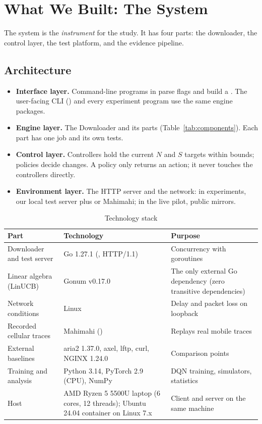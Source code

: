 \chapter{What We Built: The System}\label{ch:system}
The system is the \emph{instrument} for the study. It has four parts: the downloader, the control layer, the test platform, and the evidence pipeline.

\section{Architecture}

\begin{itemize}
\item \textbf{Interface layer.} Command-line programs in  parse flags and build a . The user-facing CLI () and every experiment program use the same engine packages.
\item \textbf{Engine layer.} The Downloader and its parts (Table~\ref{tab:components}). Each part has one job and its own tests.
\item \textbf{Control layer.} Controllers hold the current $N$ and $S$ targets within bounds; policies decide changes. A policy only returns an action; it never touches the controllers directly.
\item \textbf{Environment layer.} The HTTP server and the network: in experiments, our local test server plus  or Mahimahi; in the live pilot, public mirrors.
\end{itemize}

\begin{table}[H]\centering
\caption{Technology stack}\label{tab:stack}
\begin{tabularx}{\linewidth}{@{}lLL@{}}
\toprule
\textbf{Part} & \textbf{Technology} & \textbf{Purpose}\\
\midrule
Downloader and test server & Go 1.27.1 (, HTTP/1.1) & Concurrency with goroutines\\
Linear algebra (LinUCB) & Gonum v0.17.0 & The only external Go dependency (zero transitive dependencies)\\
Network conditions & Linux  & Delay and packet loss on loopback\\
Recorded cellular traces & Mahimahi () & Replays real mobile traces\\
External baselines & aria2 1.37.0, axel, lftp, curl, NGINX 1.24.0 & Comparison points\\
Training and analysis & Python 3.14, PyTorch 2.9 (CPU), NumPy & DQN training, simulators, statistics\\
Host & AMD Ryzen 5 5500U laptop (6 cores, 12 threads); Ubuntu 24.04 container on Linux 7.x & Client and server on the same machine\\
\bottomrule
\end{tabularx}
\end{table}

